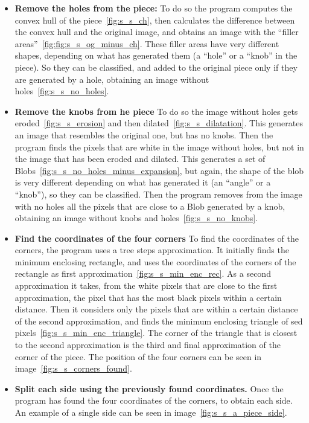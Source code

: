 \documentclass{article}
\begin{document}
\begin{itemize}

  \item \textbf{Remove the holes from the piece:}\newline
  To do so the program computes the convex hull of the piece~\ref{fig:s_s_ch},
  then calculates the difference between the convex hull and the original image,
  and obtains an image with the “filler areas”~\ref{fig:fig:s_s_og_minus_ch}.
  These filler areas have very different shapes,
  depending on what has generated them (a “hole” or a “knob” in the piece).
  So they can be classified, and added to the original piece only if
  they are generated by a hole, obtaining an image without holes~\ref{fig:s_s_no_holes}.

  \item \textbf{Remove the knobs from he piece}\newline
  To do so the image without holes gets eroded~\ref{fig:s_s_erosion} and then dilated~\ref{fig:s_s_dilatation}.
  This generates an image that resembles the original one, but has no knobs.
  Then the program finds the pixels that are white in the image without holes,
  but not in the image that has been eroded and dilated.
  This generates a set of Blobs~\ref{fig:s_s_no_holes_minus_expansion},
  but again, the shape of the blob is very different depending on what has generated it
  (an “angle” or a “knob”), so they can be classified.
  Then the program removes from the image with no holes all the pixels that are
  close to a Blob generated by a knob, obtaining an image without knobs and holes~\ref{fig:s_s_no_knobs}.
  
  \item \textbf{Find the coordinates of the four corners}\newline
  To find the coordinates of the corners, the program uses a tree steps approximation.
  It initially finds the minimum enclosing rectangle,
  and uses the coordinates of the corners of the rectangle
  as first approximation~\ref{fig:s_s_min_enc_rec}.\newline
  As a second approximation it takes,
  from the white pixels that are close to the first approximation,
  the pixel that has the most black pixels within a certain distance.
  Then it considers only the pixels that are within a certain
  distance of the second approximation, and finds the minimum
  enclosing triangle of sed pixels~\ref{fig:s_s_min_enc_triangle}.\newline
  The corner of the triangle that is closest to the second
  approximation is the third and final approximation
  of the corner of the piece.
  The position of the four corners can be seen in image~\ref{fig:s_s_corners_found}.

  \item \textbf{Split each side using the previously found coordinates.}\newline
	Once the program has found the four coordinates of the corners, to obtain each
  side. An example of a single side can be seen in image~\ref{fig:s_s_a_piece_side}.
\end{itemize}
\end{document}
